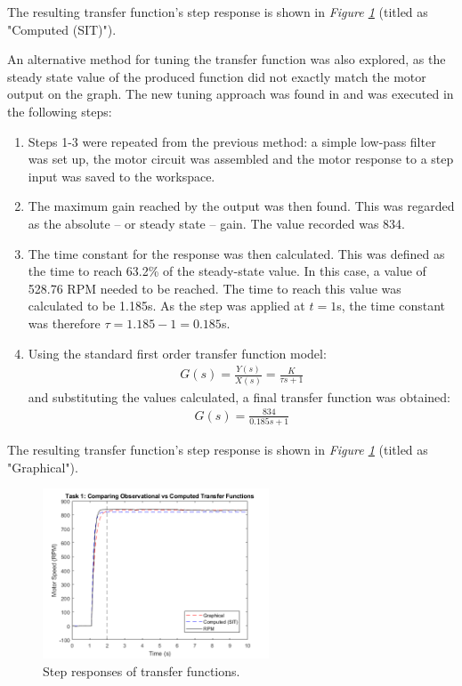 \documentclass[11pt, onecolumn]{article}
\begin{document}
\par The resulting transfer function's step response is shown in \textit{Figure \ref{fig:q1-graph}} (titled as "Computed (SIT)").
\par An alternative method for tuning the transfer function was also explored, as the steady state value of the produced function did not exactly match the motor output on the graph. The new tuning approach was found in \cite{umichControlTutorials} and was executed in the following steps:
\begin{enumerate}
    \item Steps 1-3 were repeated from the previous method: a simple low-pass filter was set up, the motor circuit was assembled and the motor response to a step input was saved to the workspace.
    \item The maximum gain reached by the output was then found. This was regarded as the absolute – or steady state – gain. The value recorded was 834.
    \item The time constant for the response was then calculated. This was defined as the time to reach 63.2\% of the steady-state value. In this case, a value of 528.76 RPM needed to be reached. The time to reach this value was calculated to be 1.185s. As the step was applied at $t=1$s, the time constant was therefore $\tau = 1.185 - 1 = 0.185$s.
    \item Using the standard first order transfer function model:
          \begin{align*}
              G(s)=\frac{Y(s)}{X(s)}=\frac{K}{\tau s + 1}
          \end{align*}
          and substituting the values calculated, a final transfer function was obtained:
          \begin{align*}
              G(s)=\frac{834}{0.185s + 1}
          \end{align*}
\end{enumerate}
\par The resulting transfer function's step response is shown in \textit{Figure \ref{fig:q1-graph}} (titled as "Graphical").
\begin{figure}[h!]
    \centering
    \includegraphics[width=0.6\textwidth]{q1-graphs.png}
    \caption{Step responses of transfer functions.}
    \label{fig:q1-graph}
\end{figure}
\end{document}
